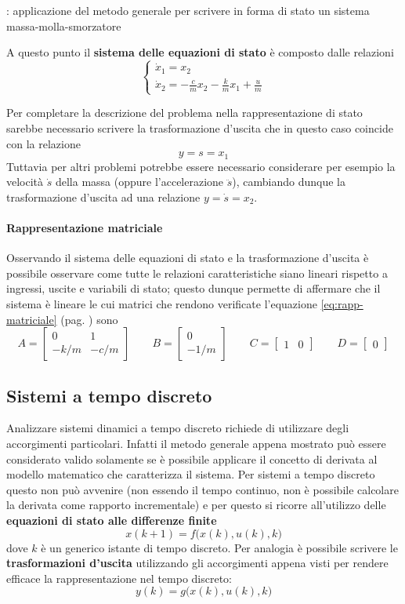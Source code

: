 \begin{esempio}{: applicazione del metodo generale per scrivere in forma di stato un sistema massa-molla-smorzatore}
\begin{enumerate}
				A questo punto il \textbf{sistema delle equazioni di stato} è composto dalle relazioni
				\[  \begin{cases}
					\dot x_1 = x_2 \\ \dot x_2 = - \frac c m x_2 - \frac k m x_1 + \frac u m
				\end{cases} \]				
			\end{enumerate}
			Per completare la descrizione del problema nella rappresentazione di stato sarebbe necessario scrivere la trasformazione d'uscita che in questo caso coincide con la relazione
			\[  y = s = x_1 \]
			Tuttavia per altri problemi potrebbe essere necessario considerare per esempio la velocità $\dot s$ della massa (oppure l'accelerazione $\ddot s$), cambiando dunque la trasformazione d'uscita ad una relazione $y = \dot s = x_2$.
			
			\paragraph{Rappresentazione matriciale} Osservando il sistema delle equazioni di stato e la trasformazione d'uscita è possibile osservare come tutte le relazioni caratteristiche siano lineari rispetto a ingressi, uscite e variabili di stato; questo dunque permette di affermare che il sistema è lineare le cui matrici che rendono verificate l'equazione \ref{eq:rapp-matriciale} (pag. \pageref{eq:rapp-matriciale}) sono
			\[ A = \begin{bmatrix}
				0 & 1 \\ -k/m & - c/m
			\end{bmatrix} \qquad B = \begin{bmatrix}
				0 \\ -1/m
			\end{bmatrix} \qquad C = \begin{bmatrix}
				1 & 0
			\end{bmatrix} \qquad D = \begin{bmatrix}
				0
			\end{bmatrix} \]
		\end{esempio}
	
	\subsection{Sistemi a tempo discreto}
		Analizzare sistemi dinamici a tempo discreto richiede di utilizzare degli accorgimenti particolari. Infatti il metodo generale appena mostrato può essere considerato valido solamente se è possibile applicare il concetto di derivata al modello matematico che caratterizza il sistema. Per sistemi a tempo discreto questo non può avvenire (non essendo il tempo continuo, non è possibile calcolare la derivata come rapporto incrementale) e per questo si ricorre all'utilizzo delle \textbf{equazioni di stato alle differenze finite}
		\[ x(k+1) = f\Big(x(k),u(k), k\Big)  \]
		dove $k$ è un generico istante di tempo discreto. Per analogia è possibile scrivere le \textbf{trasformazioni d'uscita} utilizzando gli accorgimenti appena visti per rendere efficace la rappresentazione nel tempo discreto:
		\[ y(k) = g\Big(x(k), u(k), k\Big)  \]
		
